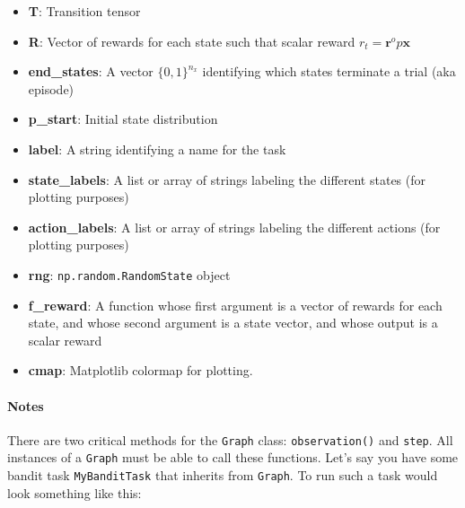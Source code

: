\begin{itemize}
\tightlist
\item
  \textbf{T}: Transition tensor
\item
  \textbf{R}: Vector of rewards for each state such that scalar reward
  \(r_t = \mathbf r^ op \mathbf x\)
\item
  \textbf{end\_states}: A vector \(\{0, 1\}^{n_x}\) identifying which
  states terminate a trial (aka episode)
\item
  \textbf{p\_start}: Initial state distribution
\item
  \textbf{label}: A string identifying a name for the task
\item
  \textbf{state\_labels}: A list or array of strings labeling the
  different states (for plotting purposes)
\item
  \textbf{action\_labels}: A list or array of strings labeling the
  different actions (for plotting purposes)
\item
  \textbf{rng}: \texttt{np.random.RandomState} object
\item
  \textbf{f\_reward}: A function whose first argument is a vector of
  rewards for each state, and whose second argument is a state vector,
  and whose output is a scalar reward
\item
  \textbf{cmap}: Matplotlib colormap for plotting.
\end{itemize}

\paragraph{Notes}\label{notes}

There are two critical methods for the \texttt{Graph} class:
\texttt{observation()} and \texttt{step}. All instances of a
\texttt{Graph} must be able to call these functions. Let's say you have
some bandit task \texttt{MyBanditTask} that inherits from
\texttt{Graph}. To run such a task would look something like this:

\begin{Shaded}
\begin{Highlighting}[]
\OperatorTok{=}
\OperatorTok{=}
 
\OperatorTok{=}
\OperatorTok{=}
\OperatorTok{=}
\end{Highlighting}
\end{Shaded}

